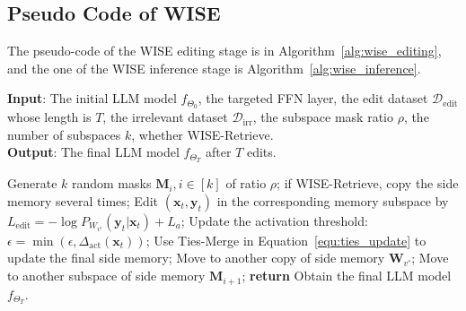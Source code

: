 \documentclass{article}
\begin{document}
\subsection{Pseudo Code of WISE}
The pseudo-code of the WISE editing stage is in Algorithm~\ref{alg:wise_editing}, and the one of the WISE inference stage is Algorithm~\ref{alg:wise_inference}.

\begin{algorithm}[h]
\vspace{-3pt}
\caption{WISE Editing Stage}
\label{alg:wise_editing}
\vspace{0.1CM}
\textbf{Input}: The initial LLM model $f_{\Theta_0}$, the targeted FFN layer, the edit dataset $\mathcal{D}_{\text{edit}}$ whose length is $T$, the irrelevant dataset $\mathcal{D}_{\text{irr}}$, the subspace mask ratio $\rho$, the number of subspaces $k$, whether WISE-Retrieve.\\
\textbf{Output}: The final LLM model $f_{\Theta_T}$ after $T$ edits.
\begin{algorithmic}[1] %
\STATE Generate $k$ random masks $\mathbf{M}_i, i \in [k]$ of ratio $\rho$; if WISE-Retrieve, copy the side memory several times;
        \STATE Edit $(\mathbf{x}_t, \mathbf{y}_t)$ in the corresponding memory subspace by $L_{\text{edit}} = -\log P_{W_{v'}}(\mathbf{y}_t | \mathbf{x}_t) + L_a$;
        \STATE Update the activation threshold: $\epsilon = \min(\epsilon, \Delta_{\text{act}}(\mathbf{x}_t))$;
            \STATE Use Ties-Merge in Equation~\ref{equ:ties_update} to update the final side memory;
                \STATE Move to another copy of side memory $\mathbf{W}_{v'}$;
            \ENDIF
        \ELSE
                \STATE Move to another subspace of side memory $\mathbf{M}_{i+1}$;
            \ENDIF
        \ENDIF
    \ENDFOR
\STATE \textbf{return} Obtain the final LLM model $f_{\Theta_T}$.
\end{algorithmic}
\end{algorithm}
\vspace{-9pt}
\end{document}
